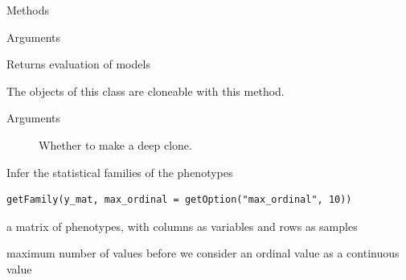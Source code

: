 \documentclass[letterpaper]{book}
\begin{document}
\begin{Section}{Methods}
\begin{SubSection}{}
\begin{SubSubSection}{Arguments}
\begin{description}
\end{description}



\end{SubSubSection}

%
\begin{SubSubSection}{Returns}
evaluation of models

\end{SubSubSection}

\end{SubSection}




\hypertarget{method-dataH-clone}{}
%
\begin{SubSection}{}
The objects of this class are cloneable with this method.
%

%
\begin{SubSubSection}{Arguments}

\begin{description}

\item[] Whether to make a deep clone.

\end{description}



\end{SubSubSection}

\end{SubSection}


\end{Section}
%
\begin{Description}
Infer the statistical families of the phenotypes
\end{Description}
%
\begin{Usage}
\begin{verbatim}
getFamily(y_mat, max_ordinal = getOption("max_ordinal", 10))
\end{verbatim}
\end{Usage}
%
\begin{Arguments}
\begin{ldescription}
\item[\code{y\_mat}] a matrix of phenotypes, with columns as variables and rows as samples

\item[\code{max\_ordinal}] maximum number of values before we consider an ordinal value as a continuous value
\end{ldescription}
\end{Arguments}
\end{document}
